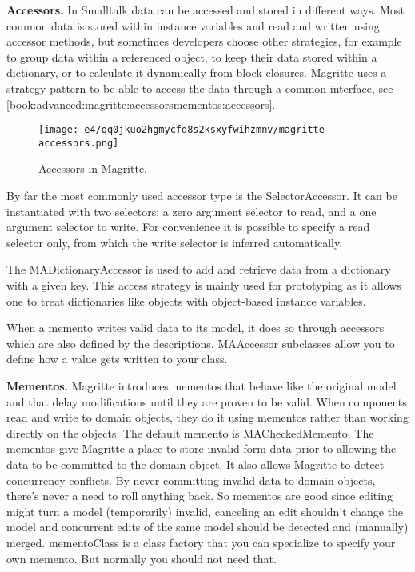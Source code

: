 \documentclass[a4paper,10pt,twoside]{book}
\newcommand{\ct}[1]{{\small\ttfamily\textup{#1}}}
\begin{document}
\textbf{Accessors.} In Smalltalk data can be accessed and stored in different ways. Most common data is stored within instance variables and read and written using accessor methods, but sometimes developers choose other strategies, for example to group data within a referenced object, to keep their data stored within a dictionary, or to calculate it dynamically from block closures. Magritte uses a strategy pattern to be able to access the data through a common interface, see \autoref{book:advanced:magritte:accessorsmementos:accessors}.

\begin{figure}[h!tbp]
	\begin{center}
		\texttt{[image: e4/qq0jkuo2hgmycfd8s2ksxyfwihzmnv/magritte-accessors.png]}
		\caption{Accessors in Magritte.\label{book:advanced:magritte:accessorsmementos:accessors}}
	\end{center}
\end{figure}


By far the most commonly used accessor type is the \ct{SelectorAccessor}. It can be instantiated with two selectors: a zero argument selector to read, and a one argument selector to write. For convenience  it is possible to specify a read selector only, from which the write selector is  inferred automatically. 

The \ct{MADictionaryAccessor} is used to add and retrieve data from a dictionary with a given key. This access strategy is mainly used for prototyping as it allows one to treat dictionaries like objects with object-based instance variables. 

When a memento writes valid data to its model, it does so through accessors which are also defined by  the descriptions. \ct{MAAccessor} subclasses allow you to define how a value gets written to your class.

\textbf{Mementos.} Magritte introduces mementos that behave like the original model and that delay modifications until they are proven to be valid. When components read and write to domain objects, they do it using mementos rather than working directly on  the objects. The default memento is \ct{MACheckedMemento}. The mementos give Magritte a place to store invalid form data prior to allowing the data to be committed to the domain object. It also allows Magritte to detect concurrency conflicts. By never committing invalid data to domain objects, there's never a need to roll anything back. So mementos are good since editing might turn a model (temporarily) invalid, canceling an edit shouldn't change the model and concurrent edits of the same model should be detected and (manually) merged. \ct{mementoClass} is a class factory that you can specialize to specify your own memento. But normally you should not need that. 
\end{document}
